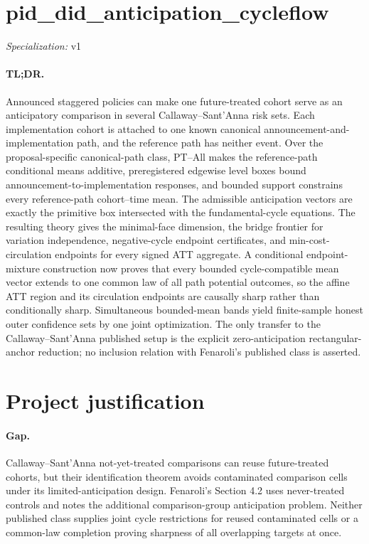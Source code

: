 \documentclass{article}
\begin{document}
\sloppy

\section*{pid\_\allowbreak{}did\_\allowbreak{}anticipation\_\allowbreak{}cycleflow}

\noindent\textit{Specialization:} v1\par

\paragraph{TL;DR.} Announced staggered policies can make one future-treated cohort serve as an anticipatory comparison in several Callaway--Sant'Anna risk sets. Each implementation cohort is attached to one known canonical announcement-and-implementation path, and the reference path has neither event. Over the proposal-specific canonical-path class, PT--All makes the reference-path conditional means additive, preregistered edgewise level boxes bound announcement-to-implementation responses, and bounded support constrains every reference-path cohort--time mean. The admissible anticipation vectors are exactly the primitive box intersected with the fundamental-cycle equations. The resulting theory gives the minimal-face dimension, the bridge frontier for variation independence, negative-cycle endpoint certificates, and min-cost-circulation endpoints for every signed ATT aggregate. A conditional endpoint-mixture construction now proves that every bounded cycle-compatible mean vector extends to one common law of all path potential outcomes, so the affine ATT region and its circulation endpoints are causally sharp rather than conditionally sharp. Simultaneous bounded-mean bands yield finite-sample honest outer confidence sets by one joint optimization. The only transfer to the Callaway--Sant'Anna published setup is the explicit zero-anticipation rectangular-anchor reduction; no inclusion relation with Fenaroli's published class is asserted.

\section{Project justification}

\paragraph{Gap.} Callaway--Sant'Anna not-yet-treated comparisons can reuse future-treated cohorts, but their identification theorem avoids contaminated comparison cells under its limited-anticipation design. Fenaroli's Section 4.2 uses never-treated controls and notes the additional comparison-group anticipation problem. Neither published class supplies joint cycle restrictions for reused contaminated cells or a common-law completion proving sharpness of all overlapping targets at once.
\end{document}

